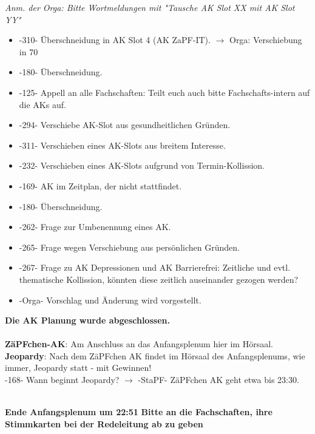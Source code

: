   \textit{Anm. der Orga: Bitte Wortmeldungen mit "Tausche AK Slot XX mit AK Slot YY"}
  \begin{itemize}
    \item -310- Überschneidung in AK Slot 4 (AK ZaPF-IT). $\rightarrow$ Orga: Verschiebung in 70
    \item -180- Überschneidung.
    \item -125- Appell an alle Fachschaften: Teilt euch auch bitte Fachschafts-intern auf die AKs auf.
    \item -294- Verschiebe AK-Slot aus gesundheitlichen Gründen.
    \item -311- Verschieben eines AK-Slots aus breitem Interesse.
    \item -232- Verschieben eines AK-Slots aufgrund von Termin-Kollission.
    \item -169- AK im Zeitplan, der nicht stattfindet.
    \item -180- Überschneidung.
    \item -262- Frage zur Umbenennung eines AK.
    \item -265- Frage wegen Verschiebung aus persönlichen Gründen.
    \item -267- Frage zu AK Depressionen und AK Barrierefrei: Zeitliche und evtl. thematische Kollission, könnten diese zeitlich auseinander gezogen werden?
    \item -Orga- Vorschlag und Änderung wird vorgestellt.
  \end{itemize}
  \textbf{Die AK Planung wurde abgeschlossen.} \\ \\

  \textbf{ZäPFchen-AK}: Am Anschluss an das Anfangsplenum hier im Hörsaal. \\
  \textbf{Jeopardy}: Nach dem ZäPFchen AK findet im Hörsaal des Anfangsplenums, wie immer, Jeopardy statt - mit Gewinnen! \\
    -168- Wann beginnt Jeopardy? $\rightarrow$ -StaPF- ZäPFchen AK geht etwa bis 23:30. \\ \\

\begin{center}
  \textbf{Ende Anfangsplenum um 22:51}
  \textbf{Bitte an die Fachschaften, ihre Stimmkarten bei der Redeleitung ab zu geben}
\end{center}

